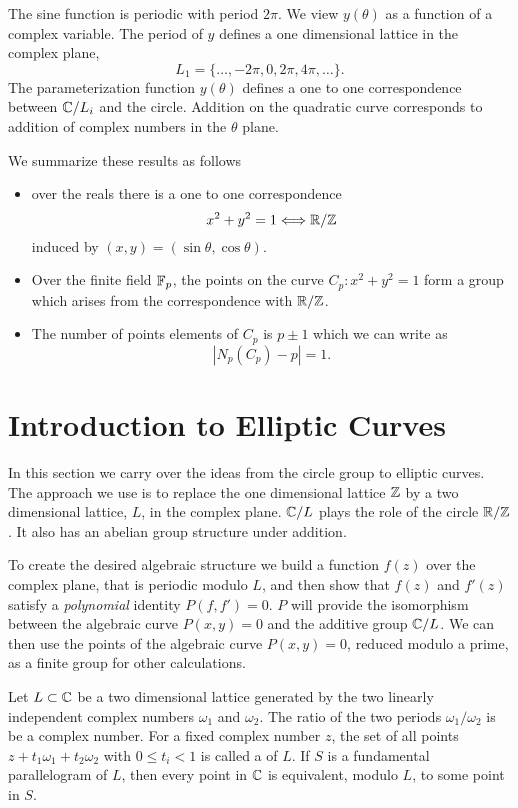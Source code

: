 The sine function is periodic with period $2\pi$.  We view $y(\theta)$
as a function of a complex variable.  The period of $y$ defines a one
dimensional lattice in the complex plane,
\[
L_1 = \{ \ldots, -2\pi, 0, 2\pi, 4\pi, \ldots \}.
\]
The parameterization function $y(\theta)$ defines a one to
one correspondence between $\mathbb{C} / L_i$ and the circle.  Addition on the
quadratic curve corresponds to addition of complex numbers in the
$\theta$ plane.

We summarize these results as follows
\begin {itemize}
\item over the reals there is a one to one correspondence
\[
x^2 + y^2 = 1 \Longleftrightarrow \mathbb{R}/\mathbb{Z}
\]
induced by $(x, y) = (\sin \theta, \cos \theta)$.

\item  Over the finite field $\mathbb{F}_p$, the points on the curve $C_p : x^2+y^2=1$
form a group which arises from the correspondence with $\mathbb{R}/\mathbb{Z}$.

\item The number of points elements of $C_p$ is $p \pm 1$ which we can
write as
\[
\left| N_p(C_p) - p \right| = 1.
\]
\end{itemize}

\section{Introduction to Elliptic Curves}
\label{Elliptic:Intro:Sec}

In this section we carry over the ideas from the circle group to
elliptic curves.  The approach we use is to replace the one
dimensional lattice $\mathbb{Z}$ by a two dimensional lattice, $L$, in the
complex plane.  $\mathbb{C}/L$ plays the role of the circle $\mathbb{R}/\mathbb{Z}$.
It also has an abelian group structure under addition. 

To create the desired algebraic structure we build a function $f(z)$
over the complex plane, that is periodic modulo $L$, and then show
that $f(z)$ and $f'(z)$ satisfy a {\em polynomial} identity $P(f, f')
= 0$.  $P$ will provide the isomorphism between the algebraic
curve $P(x, y) = 0$ and the additive group
$\mathbb{C}/L$.  We can then use the points of the algebraic curve $P(x, y) =
0$, reduced modulo a prime, as a finite group for other calculations. 

Let $L \subset \mathbb{C}$ be a two dimensional lattice generated by the two
linearly independent complex numbers $\omega_1$ and $\omega_2$.  The
ratio of the two periods $\omega_1/\omega_2$ is be a complex number.
For a fixed complex number $z$, the set of all points $z + t_1
\omega_1 + t_2 \omega_2$ with  $0 \le t_i < 1$ is called a  of $L$.  If $S$ is a fundamental parallelogram of $L$,
then every point in $\mathbb{C}$ is equivalent, modulo $L$, to some point in
$S$.  
 
